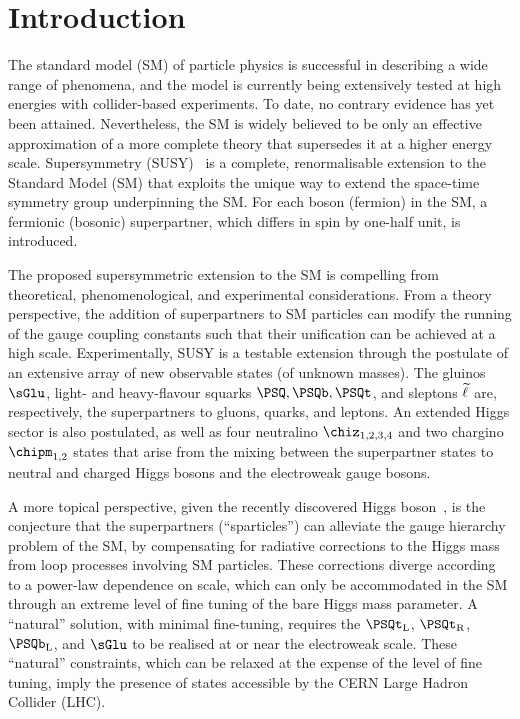 \section{Introduction}
\label{sec:introduction}

The standard model (SM) of particle physics is successful in
describing a wide range of phenomena, and the model is currently being
extensively tested at high energies with collider-based experiments.
To date, no contrary evidence has yet been attained. Nevertheless, the
SM is widely believed to be only an effective approximation of a more
complete theory that supersedes it at a higher energy
scale. Supersymmetry (SUSY)~\cite{ref:SUSY-1, ref:SUSY0, ref:SUSY1,
  ref:SUSY2, ref:SUSY3, ref:SUSY4, ref:hierarchy1, ref:hierarchy2} is
a complete, renormalisable extension to the Standard Model (SM) that
exploits the unique way to extend the space-time symmetry group
underpinning the SM. For each boson (fermion) in the SM, a fermionic
(bosonic) superpartner, which differs in spin by one-half unit, is
introduced.

The proposed supersymmetric extension to the SM is compelling from
theoretical, phenomenological, and experimental considerations. From a
theory perspective, the addition of superpartners to SM particles can
modify the running of the gauge coupling constants such that their
unification can be achieved at a high scale. Experimentally, SUSY is a
testable extension through the postulate of an extensive array of new
observable states (of unknown masses). The gluinos $\sGlu$, light- and
heavy-flavour squarks $\PSQ, \PSQb, \PSQt$, and sleptons $\widetilde{\ell}$ are,
respectively, the superpartners to gluons, quarks, and leptons. An
extended Higgs sector is also postulated, as well as four neutralino
$\chiz_{1,2,3,4}$ and two chargino $\chipm_{1,2}$ states that arise
from the mixing between the superpartner states to neutral and charged
Higgs bosons and the electroweak gauge bosons. %

A more topical perspective, given the recently discovered Higgs
boson~\cite{ref:atlashiggsdiscovery, ref:cmshiggsdiscoverylong}, is
the conjecture that the superpartners (``sparticles'') can alleviate
the gauge hierarchy problem of the SM, by compensating for radiative
corrections to the Higgs mass from loop processes involving SM
particles. These corrections diverge according to a power-law
dependence on scale, which can only be accommodated in the SM through
an extreme level of fine tuning of the bare Higgs mass parameter. A
``natural'' solution, with minimal fine-tuning, requires the
$\PSQt_\text{L}$, $\PSQt_\text{R}$, $\PSQb_\text{L}$, and $\sGlu$ to
be realised at or near the electroweak scale. These ``natural''
constraints, which can be relaxed at the expense of the level of fine
tuning, imply the presence of states accessible by the CERN Large
Hadron Collider (LHC). %


